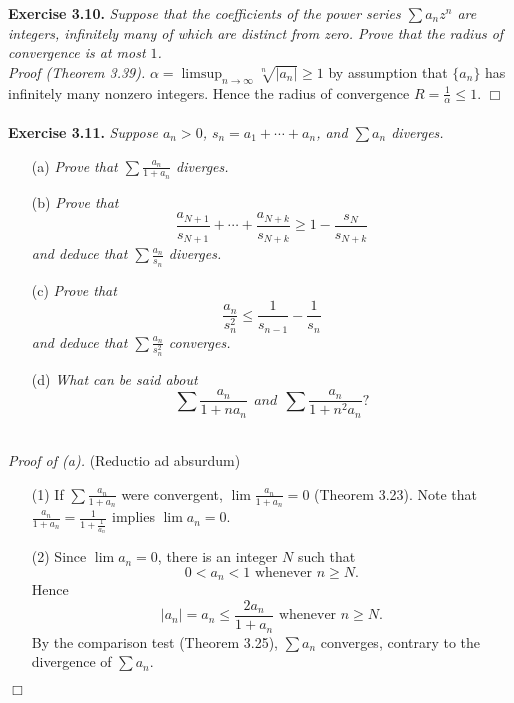 \documentclass{article}
\begin{document}



\textbf{Exercise 3.10.}
\emph{Suppose that the coefficients of the power series $\sum a_n z^n$ are integers,
infinitely many of which are distinct from zero.
Prove that the radius of convergence is at most $1$.} \\

\emph{Proof (Theorem 3.39).}
$\alpha = \limsup_{n \to \infty} \sqrt[n]{|a_n|} \geq 1$ by assumption
that $\{a_n\}$ has infinitely many nonzero integers.
Hence the radius of convergence $R = \frac{1}{\alpha} \leq 1$.
$\Box$ \\\\






\textbf{Exercise 3.11.}
\emph{Suppose $a_n > 0$, $s_n = a_1 + \cdots + a_n$, and $\sum a_n$ diverges.}
\begin{enumerate}
\item[(a)]
\emph{Prove that $\sum \frac{a_n}{1+a_n}$ diverges.}
\item[(b)]
\emph{Prove that
$$\frac{a_{N+1}}{s_{N+1}} + \cdots + \frac{a_{N+k}}{s_{N+k}}
\geq 1 - \frac{s_N}{s_{N+k}}$$
and deduce that $\sum \frac{a_n}{s_n}$ diverges.}
\item[(c)]
\emph{Prove that
$$\frac{a_n}{s_n^2} \leq \frac{1}{s_{n-1}} - \frac{1}{s_n}$$
and deduce that $\sum \frac{a_n}{s_n^2}$ converges.}
\item[(d)]
\emph{What can be said about
$$\sum \frac{a_n}{1+na_n} \:\: and \:\: \sum \frac{a_n}{1+n^2 a_n}?$$} \\
\end{enumerate}



\emph{Proof of (a).}
(Reductio ad absurdum)
\begin{enumerate}
  \item[(1)]
  If $\sum \frac{a_n}{1+a_n}$ were convergent,
  $\lim \frac{a_n}{1+a_n} = 0$ (Theorem 3.23).
  Note that $\frac{a_n}{1+a_n} = \frac{1}{1+\frac{1}{a_n}}$ implies
  $\lim a_n = 0$.
  \item[(2)]
  Since $\lim a_n = 0$, there is an integer $N$ such that
  $$0 < a_n < 1 \text{ whenever } n \geq N.$$
  Hence
  $$|a_n| = a_n \leq \frac{2a_n}{1+a_n} \text{ whenever } n \geq N.$$
  By the comparison test (Theorem 3.25),
  $\sum a_n$ converges, contrary to the divergence of $\sum a_n$.
\end{enumerate}
$\Box$ \\
\end{document}
